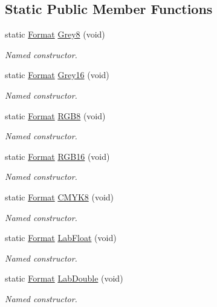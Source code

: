 \subsection*{Static Public Member Functions}
\begin{DoxyCompactItemize}
\item 
static \hyperlink{class_c_m_s_1_1_format}{Format} \hyperlink{class_c_m_s_1_1_format_ad48e99a1681174df84401f86506e7f15}{Grey8} (void)
\begin{DoxyCompactList}\small\item\em Named constructor. \end{DoxyCompactList}\item 
static \hyperlink{class_c_m_s_1_1_format}{Format} \hyperlink{class_c_m_s_1_1_format_a6df52d558cb752a1126f19d075fecb2f}{Grey16} (void)
\begin{DoxyCompactList}\small\item\em Named constructor. \end{DoxyCompactList}\item 
static \hyperlink{class_c_m_s_1_1_format}{Format} \hyperlink{class_c_m_s_1_1_format_a1f6bc07fa0229b02f25ec98b72c92ea1}{R\+G\+B8} (void)
\begin{DoxyCompactList}\small\item\em Named constructor. \end{DoxyCompactList}\item 
static \hyperlink{class_c_m_s_1_1_format}{Format} \hyperlink{class_c_m_s_1_1_format_aca9c530080478b9cc9807d987b036ad4}{R\+G\+B16} (void)
\begin{DoxyCompactList}\small\item\em Named constructor. \end{DoxyCompactList}\item 
static \hyperlink{class_c_m_s_1_1_format}{Format} \hyperlink{class_c_m_s_1_1_format_ab14bca2feccc809320606e05e7a19e94}{C\+M\+Y\+K8} (void)
\begin{DoxyCompactList}\small\item\em Named constructor. \end{DoxyCompactList}\item 
static \hyperlink{class_c_m_s_1_1_format}{Format} \hyperlink{class_c_m_s_1_1_format_aeecc7328f77c9233c0b163f12974bdbd}{Lab\+Float} (void)
\begin{DoxyCompactList}\small\item\em Named constructor. \end{DoxyCompactList}\item 
static \hyperlink{class_c_m_s_1_1_format}{Format} \hyperlink{class_c_m_s_1_1_format_a18273f509a1a56a7783a7cbdddac4f4f}{Lab\+Double} (void)
\begin{DoxyCompactList}\small\item\em Named constructor. \end{DoxyCompactList}\end{DoxyCompactItemize}
